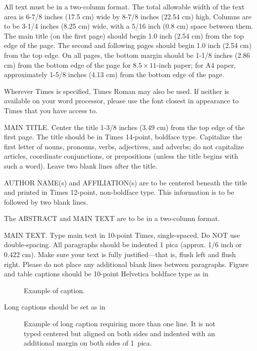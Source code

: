 \documentclass[times, 10pt,two column]{article}
\begin{document}

All text must be in a two-column format. The total allowable width of 
the text area is 6-7/8 inches (17.5 cm) wide by 8-7/8 inches (22.54 cm) 
high. Columns are to be 3-1/4 inches (8.25 cm) wide, with a 5/16 inch 
(0.8 cm) space between them. The main title (on the first page) should 
begin 1.0 inch (2.54 cm) from the top edge of the page. The second and 
following pages should begin 1.0 inch (2.54 cm) from the top edge. On 
all pages, the bottom margin should be 1-1/8 inches (2.86 cm) from the 
bottom edge of the page for $8.5 \times 11$-inch paper; for A4 paper, 
approximately 1-5/8 inches (4.13 cm) from the bottom edge of the page.


Wherever Times is specified, Times Roman may also be used. If neither is 
available on your word processor, please use the font closest in 
appearance to Times that you have access to.

MAIN TITLE. Center the title 1-3/8 inches (3.49 cm) from the top edge of 
the first page. The title should be in Times 14-point, boldface type. 
Capitalize the first letter of nouns, pronouns, verbs, adjectives, and 
adverbs; do not capitalize articles, coordinate conjunctions, or 
prepositions (unless the title begins with such a word). Leave two blank 
lines after the title.

AUTHOR NAME(s) and AFFILIATION(s) are to be centered beneath the title 
and printed in Times 12-point, non-boldface type. This information is to 
be followed by two blank lines.

The ABSTRACT and MAIN TEXT are to be in a two-column format. 

MAIN TEXT. Type main text in 10-point Times, single-spaced. Do NOT use 
double-spacing. All paragraphs should be indented 1 pica (approx. 1/6 
inch or 0.422 cm). Make sure your text is fully justified---that is, 
flush left and flush right. Please do not place any additional blank 
lines between paragraphs. Figure and table captions should be 10-point 
Helvetica boldface type as in
\begin{figure}[h]
   \caption{Example of caption.}
\end{figure}

\noindent Long captions should be set as in 
\begin{figure}[h] 
   \caption{Example of long caption requiring more than one line. It is 
     not typed centered but aligned on both sides and indented with an 
     additional margin on both sides of 1~pica.}
\end{figure}
\end{document}
